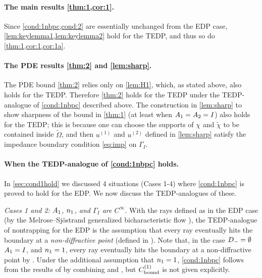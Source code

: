 \paragraph{The main results \cref{thm:1,cor:1}.}
Since \cref{cond:1nbpc,cond:2} are essentially unchanged from the EDP case, \cref{lem:keylemma1,lem:keylemma2} hold for the TEDP, and thus so do \cref{thm:1,cor:1,cor:1a}.

\paragraph{The PDE results \cref{thm:2} and \cref{lem:sharp}.}

The PDE bound \cref{thm:2} relies only on \cref{lem:H1}, which, as stated above, also holds for the TEDP. Therefore \cref{thm:2} holds for the TEDP under the TEDP-analogue of \cref{cond:1nbpc} described above. The construction in \cref{lem:sharp} to show sharpness of the bound in \cref{thm:1} (at least when $A_{1}= A_{2}= I$) also holds for the TEDP; this is because one can choose the supports of $\chi$ and $\widetilde{\chi}$ to be contained inside $\widetilde{\Omega}$, and then $u^{(1)}$ and $u^{(2)}$ defined in \cref{lem:sharp} satisfy the impedance boundary condition \cref{eq:imp} on $\Gamma_I$.

\paragraph{When the TEDP-analogue of \cref{cond:1nbpc} holds.}

In \cref{sec:cond1hold} we discussed 4 situations (Cases 1-4) where \cref{cond:1nbpc} is proved to hold for the EDP. We now discuss the TEDP-analogues of these.

\emph{Cases 1 and 2: $A_{1}$, $n_{1}$, and $\Gamma_I$  are $C^\infty$.} 
With the rays defined as in the EDP case (by the Melrose--Sj{\"o}strand generalized bicharacteristic flow 
\cite[\S24.3]{Ho:85}), the TEDP-analogue of nontrapping for the EDP is the assumption that 
every ray eventually hits the boundary at a \emph{non-diffractive point} (defined in \cite[Page 1037]{BaLeRa:92}). Note that, in the case $D_{-}=\emptyset$ $A_{1}= I$, and $n_{1}=1$, every ray eventually hits the boundary at a non-diffractive point by \cite[Lemma 5.3]{BaSpWu:16}.
Under the additional assumption that $n_{1}= 1$, \cref{cond:1nbpc} follows from the results of \cite{BaLeRa:92} by combining \cite[Theorem 1.8]{BaSpWu:16} and \cite[Remark 5.6]{BaSpWu:16}, but $C^{(1)}_{\rm bound}$ is not given explicitly.


